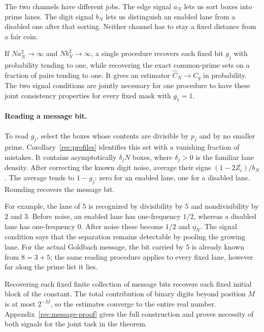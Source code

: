 The two channels have different jobs. The edge signal $a_N$ lets us
sort boxes into prime lanes. The digit signal $b_N$ lets us distinguish
an enabled lane from a disabled one after that sorting. Neither channel
has to stay a fixed distance from a fair coin.

\begin{theorem}\label{rec:message}
If $Na_N^2\to\infty$ and $Nb_N^2\to\infty$, a single procedure
recovers each fixed bit $g_j$ with probability tending to one, while
recovering the exact common-prime sets on a fraction of pairs tending
to one. It gives an estimator $\widehat C_N\to C_g$ in probability.
The two signal conditions are jointly necessary for one procedure to
have these joint consistency properties for every fixed mask with
$g_1=1$.
\end{theorem}

\paragraph{Reading a message bit.}
To read $g_j$, select the boxes whose contents are divisible by $p_j$
and by no smaller prime. Corollary~\ref{rec:profiles} identifies this
set with a vanishing fraction of mistakes. It contains asymptotically
$\delta_jN$ boxes, where $\delta_j>0$ is the familiar lane density.
After correcting the known digit noise, average their signs
$(1-2Z_i)/b_N$. The average tends to $1-g_j$: zero for an enabled lane,
one for a disabled lane. Rounding recovers the message bit.

For example, the lane of $5$ is recognized by divisibility by $5$ and
nondivisibility by $2$ and $3$. Before noise, an enabled lane has
one-frequency $1/2$, whereas a disabled lane has one-frequency $0$.
After noise these become $1/2$ and $\eta_N$. The signal condition says
that the separation remains detectable by pooling the growing lane.
For the actual Goldbach message, the bit carried by $5$ is already
known from $8=3+5$; the same reading procedure applies to every fixed
lane, however far along the prime list it lies.

Recovering each fixed finite collection of message bits recovers each
fixed initial block of the constant. The total contribution of binary
digits beyond position $M$ is at most $2^{-M}$, so the estimates converge
to the entire real number. Appendix~\ref{rec:message-proof} gives the
full construction and proves necessity of both signals for the joint
task in the theorem.

